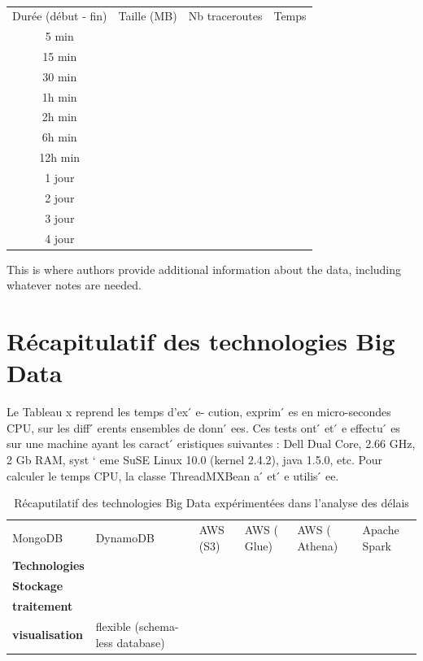 \begin{table}
\begin{threeparttable}
	\begin{tabular}{cccc}
Durée (début - fin) & Taille (MB) & Nb traceroutes & Temps \\
5 min&&&\\
15 min&&&\\
30 min&&&\\
1h min&&&\\
2h min&&&\\
6h min&&&\\
12h min&&&\\
1 jour&&&\\
2 jour&&&\\
3 jour&&&\\
4 jour&&&\\
	\end{tabular}
    \begin{tablenotes}
	\small
	\item This is where authors provide additional information about
	the data, including whatever notes are needed.
\end{tablenotes}
\end{threeparttable}
\caption{}
\label{}
\end{table}



\section{Récapitulatif des technologies Big Data}
Le Tableau
x
reprend les temps d’ex
́
e-
cution,  exprim
́
es  en  micro-secondes  CPU,
sur  les  diff
́
erents  ensembles  de  donn
́
ees.
Ces tests ont
́
et
́
e effectu
́
es sur une machine
ayant  les  caract
́
eristiques  suivantes  :  Dell
Dual Core, 2.66 GHz, 2 Gb RAM, syst
`
eme
SuSE Linux 10.0 (kernel 2.4.2), java 1.5.0,
etc.
Pour calculer le temps CPU, la classe
ThreadMXBean
a
́
et
́
e utilis
́
ee.
\begin{landscape}
	\begin{table}
		\centering
\begin{tabularx}{24cm}{ X X X XXX}
	
	
	
	MongoDB&DynamoDB &AWS (S3) &AWS ( Glue) &AWS ( Athena) &Apache Spark\\
	
	\textbf{Technologies}&&&&&\\
	
	 \textbf{Stockage} &&&&&\\
	 \textbf{traitement}&&&&&\\
	 \textbf{visualisation}&	  \LeftThumbsUp  flexible (schema-less database)
	 
	   \RightThumbsDown&&&&\\
  
\end{tabularx}
\caption{Récaputilatif des technologies Big Data expérimentées dans l'analyse des délais}
	\end{table}
\end{landscape}

